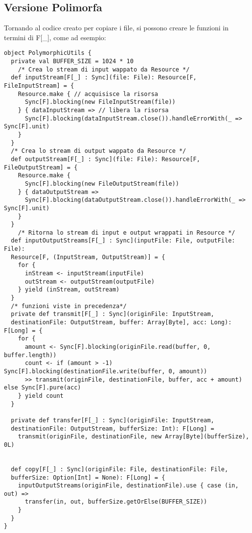 \subsection{Versione Polimorfa}
Tornando al codice creato per copiare i file, si possono creare le funzioni in termini di F[\_], come ad esempio:

\begin{verbatim}
object PolymorphicUtils {
  private val BUFFER_SIZE = 1024 * 10
    /* Crea lo stream di input wappato da Resource */
  def inputStream[F[_] : Sync](file: File): Resource[F, FileInputStream] = {
    Resource.make { // acquisisce la risorsa
      Sync[F].blocking(new FileInputStream(file))
    } { dataInputStream => // libera la risorsa
      Sync[F].blocking(dataInputStream.close()).handleErrorWith(_ => Sync[F].unit)
    }
  }
  /* Crea lo stream di output wappato da Resource */
  def outputStream[F[_] : Sync](file: File): Resource[F, FileOutputStream] = {
    Resource.make { 
      Sync[F].blocking(new FileOutputStream(file))
    } { dataOutputStream =>
      Sync[F].blocking(dataOutputStream.close()).handleErrorWith(_ => Sync[F].unit)
    }
  }
    /* Ritorna lo stream di input e output wrappati in Resource */
  def inputOutputStreams[F[_] : Sync](inputFile: File, outputFile: File): 
  Resource[F, (InputStream, OutputStream)] = {
    for {
      inStream <- inputStream(inputFile)
      outStream <- outputStream(outputFile)
    } yield (inStream, outStream)
  }
  /* funzioni viste in precedenza*/
  private def transmit[F[_] : Sync](originFile: InputStream, 
  destinationFile: OutputStream, buffer: Array[Byte], acc: Long): F[Long] = {
    for {
      amount <- Sync[F].blocking(originFile.read(buffer, 0, buffer.length))
      count <- if (amount > -1) Sync[F].blocking(destinationFile.write(buffer, 0, amount))
      >> transmit(originFile, destinationFile, buffer, acc + amount) else Sync[F].pure(acc)
    } yield count
  }

  private def transfer[F[_] : Sync](originFile: InputStream,
  destinationFile: OutputStream, bufferSize: Int): F[Long] =
    transmit(originFile, destinationFile, new Array[Byte](bufferSize), 0L)


  def copy[F[_] : Sync](originFile: File, destinationFile: File, 
  bufferSize: Option[Int] = None): F[Long] = {
    inputOutputStreams(originFile, destinationFile).use { case (in, out) =>
      transfer(in, out, bufferSize.getOrElse(BUFFER_SIZE))
    }
  }
}
    
\end{verbatim}

